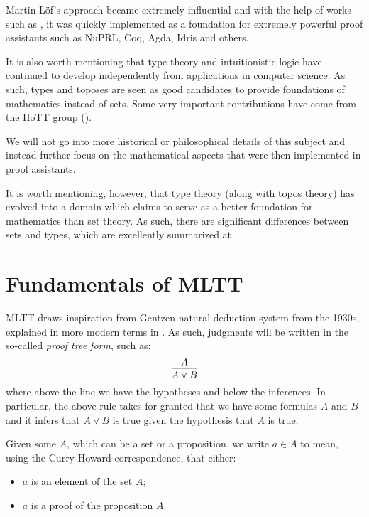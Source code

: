 Martin-L\"of's approach became extremely influential and with the help of
works such as \cite{pmltt}, it was quickly implemented as a foundation for
extremely powerful proof assistants such as NuPRL, Coq, Agda, Idris and others.

It is also worth mentioning that type theory and intuitionistic logic have
continued to develop independently from applications in computer science.
As such, types and toposes are seen as good candidates to provide
 foundations of mathematics instead of sets. Some very important
contributions have come from the HoTT group (\cite{hott}).

We will not go into more historical or philosophical details of this subject
and instead further focus on the mathematical aspects that were then
implemented in proof assistants.

It is worth mentioning, however, that type theory (along with topos theory)
has evolved into a domain which claims to serve as a better foundation for
mathematics than set theory. As such, there are significant differences
between sets and types, which are excellently summarized at
\cite[\S1.1]{hott}.


\section{Fundamentals of MLTT}

MLTT draws inspiration from Gentzen natural deduction system from the 1930s,
explained in more modern terms in \cite{girard}. As such, judgments will be
written in the so-called \emph{proof tree form}, such as:
\[
  \begin{prooftree}
    \hypo{A}
    \infer1{A \lor B}
  \end{prooftree}
\]
where above the line we have the hypotheses and below the inferences.
In particular, the above rule takes for granted that we have some formulas
$ A $ and $ B $ and it infers that $ A \lor B $ is true given the hypothesis
that $ A $ is true.

Given some $ A $, which can be a set or a proposition, we write $ a \in A $
to mean, using the Curry-Howard correspondence, that either:
\begin{itemize}
\item $ a $ is an element of the set $ A $;
\item $ a $ is a proof of the proposition $ A $.
\end{itemize}

